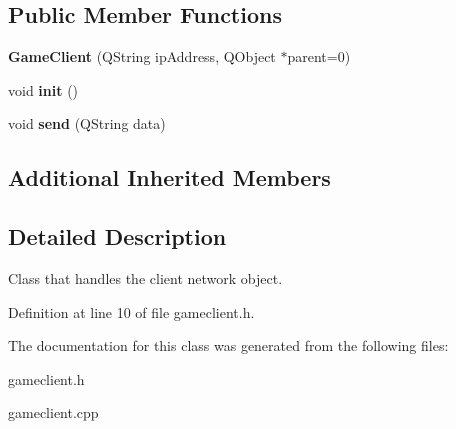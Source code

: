 \subsection*{Public Member Functions}
\begin{DoxyCompactItemize}
\item 
\hypertarget{class_game_client_a6c6faf6d8e0524f9b75041b3eaeb718d}{{\bfseries Game\-Client} (Q\-String ip\-Address, Q\-Object $\ast$parent=0)}\label{class_game_client_a6c6faf6d8e0524f9b75041b3eaeb718d}

\item 
\hypertarget{class_game_client_a96c861f5f70e645a28cf6e7a042dfc9f}{void {\bfseries init} ()}\label{class_game_client_a96c861f5f70e645a28cf6e7a042dfc9f}

\item 
\hypertarget{class_game_client_ad6130cb3cddc509730c948e0177c1be2}{void {\bfseries send} (Q\-String data)}\label{class_game_client_ad6130cb3cddc509730c948e0177c1be2}

\end{DoxyCompactItemize}
\subsection*{Additional Inherited Members}


\subsection{Detailed Description}
Class that handles the client network object. 

Definition at line 10 of file gameclient.\-h.



The documentation for this class was generated from the following files\-:\begin{DoxyCompactItemize}
\item 
gameclient.\-h\item 
gameclient.\-cpp\end{DoxyCompactItemize}
